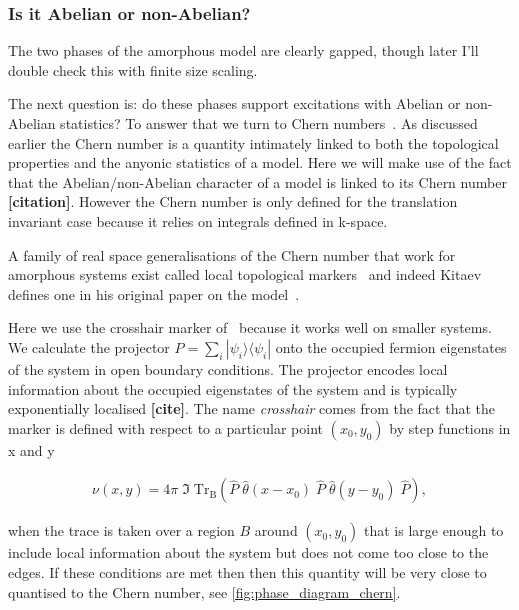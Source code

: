 \hypertarget{is-it-abelian-or-non-abelian}{%
\subsubsection{Is it Abelian or non-Abelian?}\label{is-it-abelian-or-non-abelian}}

The two phases of the amorphous model are clearly gapped, though later I'll double check this with finite size scaling.

The next question is: do these phases support excitations with Abelian or non-Abelian statistics? To answer that we turn to Chern numbers~\autocite{berryQuantalPhaseFactors1984,simonHolonomyQuantumAdiabatic1983,thoulessQuantizedHallConductance1982}. As discussed earlier the Chern number is a quantity intimately linked to both the topological properties and the anyonic statistics of a model. Here we will make use of the fact that the Abelian/non-Abelian character of a model is linked to its Chern number \textbf{{[}citation{]}}. However the Chern number is only defined for the translation invariant case because it relies on integrals defined in k-space.

A family of real space generalisations of the Chern number that work for amorphous systems exist called local topological markers~\autocite{bianco_mapping_2011,Hastings_Almost_2010,mitchellAmorphousTopologicalInsulators2018} and indeed Kitaev defines one in his original paper on the model~\autocite{kitaevAnyonsExactlySolved2006}.

Here we use the crosshair marker of~\autocite{peru_preprint} because it works well on smaller systems. We calculate the projector \(P = \sum_i |\psi_i\rangle \langle \psi_i|\) onto the occupied fermion eigenstates of the system in open boundary conditions. The projector encodes local information about the occupied eigenstates of the system and is typically exponentially localised \textbf{{[}cite{]}}. The name \emph{crosshair} comes from the fact that the marker is defined with respect to a particular point \((x_0, y_0)\) by step functions in x and y

\[\begin{aligned}
    \nu (x, y) = 4\pi \; \Im\; \mathrm{Tr}_{\mathrm{B}} 
    \left ( 
    \hat{P}\;\hat{\theta}(x-x_0)\;\hat{P}\;\hat{\theta}(y-y_0)\; \hat{P}
    \right ),
\end{aligned}\]

when the trace is taken over a region \(B\) around \((x_0, y_0)\) that is large enough to include local information about the system but does not come too close to the edges. If these conditions are met then then this quantity will be very close to quantised to the Chern number, see \cref{fig:phase_diagram_chern}.

